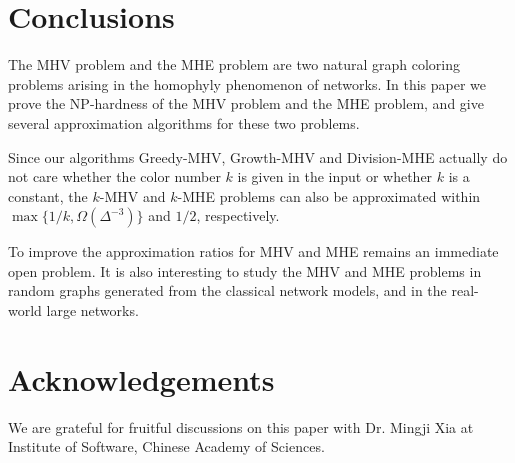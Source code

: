 \documentclass[11pt]{article}
\begin{document}
\section{Conclusions}
\label{sec - conclusions}
The MHV problem and the MHE problem are two natural graph coloring problems
arising in the homophyly phenomenon of networks. In this paper we prove
the NP-hardness of the MHV problem and the MHE problem, and give several
approximation algorithms for these two problems.

Since our algorithms {\sc Greedy-MHV}, {\sc Growth-MHV} and {\sc Division-MHE}
actually do not care whether the color number $k$ is given in the input or
whether $k$ is a constant, the $k$-MHV and $k$-MHE problems can also be
approximated within $\max\{1/k, \Omega(\Delta^{-3})\}$ and $1/2$, respectively.

To improve the approximation ratios for MHV and MHE remains an immediate
open problem. It is also interesting to study the MHV and MHE problems
in random graphs generated from the classical network models, and in the
real-world large networks.


\section*{Acknowledgements}
We are grateful for fruitful discussions on this paper with
Dr. Mingji Xia at Institute of Software, Chinese Academy of Sciences.
\end{document}
